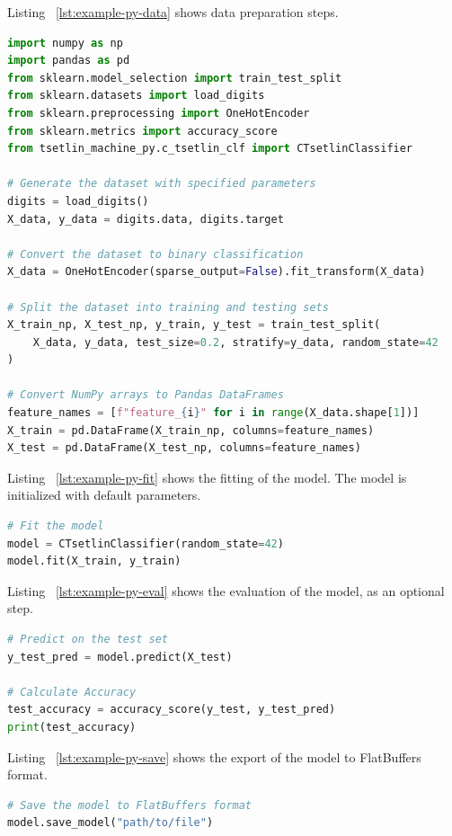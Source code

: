 \documentclass[english]{aghengthesis} %
\begin{document}
Listing ~\ref{lst:example-py-data} shows data preparation steps.
\begin{lstlisting}[language=Python,caption={[Example Python data preparation steps]Example Python data preparation steps},label=lst:example-py-data]
import numpy as np
import pandas as pd
from sklearn.model_selection import train_test_split
from sklearn.datasets import load_digits
from sklearn.preprocessing import OneHotEncoder
from sklearn.metrics import accuracy_score
from tsetlin_machine_py.c_tsetlin_clf import CTsetlinClassifier

# Generate the dataset with specified parameters
digits = load_digits()
X_data, y_data = digits.data, digits.target

# Convert the dataset to binary classification
X_data = OneHotEncoder(sparse_output=False).fit_transform(X_data)

# Split the dataset into training and testing sets
X_train_np, X_test_np, y_train, y_test = train_test_split(
    X_data, y_data, test_size=0.2, stratify=y_data, random_state=42
)

# Convert NumPy arrays to Pandas DataFrames
feature_names = [f"feature_{i}" for i in range(X_data.shape[1])]
X_train = pd.DataFrame(X_train_np, columns=feature_names)
X_test = pd.DataFrame(X_test_np, columns=feature_names)
\end{lstlisting}

Listing ~\ref{lst:example-py-fit} shows the fitting of the model. The model is initialized with default parameters.
\begin{lstlisting}[language=Python,caption={[Example Python model fitting]Example Python model fitting},label=lst:example-py-fit]
# Fit the model
model = CTsetlinClassifier(random_state=42)
model.fit(X_train, y_train)
\end{lstlisting}

Listing ~\ref{lst:example-py-eval} shows the evaluation of the model, as an optional step.
\begin{lstlisting}[language=Python,caption={[Example Python model evaluation]Example Python model evaluation},label=lst:example-py-eval]
# Predict on the test set
y_test_pred = model.predict(X_test)

# Calculate Accuracy
test_accuracy = accuracy_score(y_test, y_test_pred)
print(test_accuracy)
\end{lstlisting}

Listing ~\ref{lst:example-py-save} shows the export of the model to FlatBuffers format.
\begin{lstlisting}[language=Python,caption={[Example Python model export to FlatBuffers format]Example Python model export to FlatBuffers format},label=lst:example-py-save]
# Save the model to FlatBuffers format
model.save_model("path/to/file")
\end{lstlisting}
\end{document}
